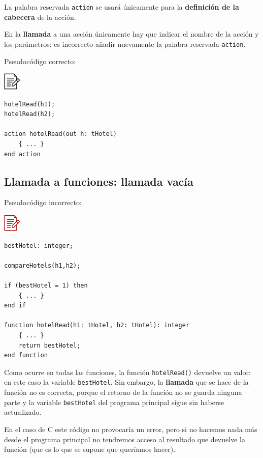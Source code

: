 \documentclass[
]{book}
\begin{document}
La palabra reservada \texttt{action} se usará únicamente para la \textbf{definición de la cabecera} de la acción.

En la \textbf{llamada} a una acción únicamente hay que indicar el nombre de la acción y los parámetros; es incorrecto añadir nuevamente la palabra reservada \texttt{action}.

Pseudocódigo correcto:

\includegraphics{./img/alg.png}

\begin{verbatim}
hotelRead(h1);
hotelRead(h2);

action hotelRead(out h: tHotel)
    { ... }
end action
\end{verbatim}

\hypertarget{llamada-a-funciones-llamada-vacuxeda}{%
\subsection{Llamada a funciones: llamada vacía}\label{llamada-a-funciones-llamada-vacuxeda}}

Pseudocódigo incorrecto:

\includegraphics{./img/alg_err.png}

\begin{verbatim}
bestHotel: integer;

compareHotels(h1,h2);

if (bestHotel = 1) then
    { ... }
end if  

function hotelRead(h1: tHotel, h2: tHotel): integer
    { ... }
    return bestHotel;
end function
\end{verbatim}

Como ocurre en todas las funciones, la función \texttt{hotelRead()} devuelve un valor: en este caso la variable \texttt{bestHotel}. Sin embargo, la \textbf{llamada} que se hace de la función no es correcta, porque el retorno de la función no se guarda ninguna parte y la variable \texttt{bestHotel} del programa principal sigue sin haberse actualizado.

En el caso de C este código no provocaría un error, pero si no hacemos nada más desde el programa principal no tendremos acceso al resultado que devuelve la función (que es lo que se supone que queríamos hacer).
\end{document}

